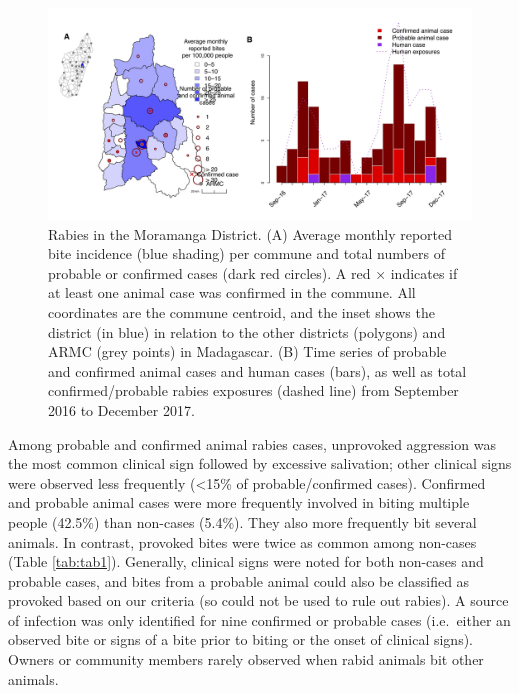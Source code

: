 \documentclass[
  oneside]{book}
\begin{document}
\begin{figure}
\includegraphics[width=0.95\linewidth]{figs/ch1/fig3} \caption[Spatial and temporal distribution of probable and confirmed animal rabies cases, human exposures, and human deaths in the Moramanga District.]{Rabies in the Moramanga District. (A) Average monthly reported bite incidence (blue shading) per commune and total numbers of probable or confirmed cases (dark red circles). A red × indicates if at least one animal case was confirmed in the commune. All coordinates are the commune centroid, and the inset shows the district (in blue) in relation to the other districts (polygons) and ARMC (grey points) in Madagascar. (B) Time series of probable and confirmed animal cases and human cases (bars), as well as total confirmed/probable rabies exposures (dashed line) from September 2016 to December 2017.}\label{fig:fig3}
\end{figure}



Among probable and confirmed animal rabies cases, unprovoked aggression was the most common clinical sign followed by excessive salivation; other clinical signs were observed less frequently (\textless15\% of probable/confirmed cases). Confirmed and probable animal cases were more frequently involved in biting multiple people (42.5\%) than non-cases (5.4\%). They also more frequently bit several animals. In contrast, provoked bites were twice as common among non-cases (Table \ref{tab:tab1}). Generally, clinical signs were noted for both non-cases and probable cases, and bites from a probable animal could also be classified as provoked based on our criteria (so could not be used to rule out rabies). A source of infection was only identified for nine confirmed or probable cases (i.e.~either an observed bite or signs of a bite prior to biting or the onset of clinical signs). Owners or community members rarely observed when rabid animals bit other animals.
\end{document}
